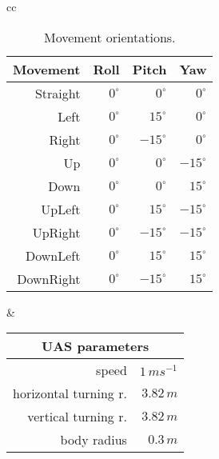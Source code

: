     \begin{tabular}{cc}
    
    \begin{minipage}[t]{0.48\textwidth}
        \begin{table}[H]
            \centering
            \begin{tabular}{r||r|r|r}
             Movement  &  Roll         & Pitch             & Yaw          \\\hline\hline
             Straight  &  $0^\circ$    & $0^\circ$         & $0^\circ$    \\\hline
             Left      &  $0^\circ$    & $15^\circ$        & $0^\circ$    \\\hline
             Right     &  $0^\circ$    & $-15^\circ$       & $0^\circ$    \\\hline
             Up        &  $0^\circ$    & $0^\circ$         & $-15^\circ$  \\\hline
             Down      &  $0^\circ$    & $0^\circ$         & $15^\circ$   \\\hline
             UpLeft    &  $0^\circ$    & $15^\circ$        & $-15^\circ$  \\\hline
             UpRight   &  $0^\circ$    & $-15^\circ$       & $-15^\circ$  \\\hline
             DownLeft  &  $0^\circ$    & $15^\circ$        & $15^\circ$   \\\hline
             DownRight &  $0^\circ$    & $-15^\circ$       & $15^\circ$   \\
            \end{tabular}
            \caption{Movement orientations.}
            \label{tab:testMovementOrientations}
        \end{table}
    \end{minipage}
    &
    \begin{minipage}[t]{0.48\textwidth}
        \begin{table}[H]
            \centering
            \begin{tabular}{r|r}
            \multicolumn{2}{c}{UAS parameters}                  \\\hline\hline
             speed                  &  $1\,ms^{-1}$             \\\hline
             horizontal turning r.  &  $3.82\,m$                \\\hline
             vertical turning r.    &  $3.82\,m$                \\\hline
             body radius            &  $0.3\,m$                 \\\hline

\end{tabular}
\end{table}
\end{minipage}
\end{tabular}
